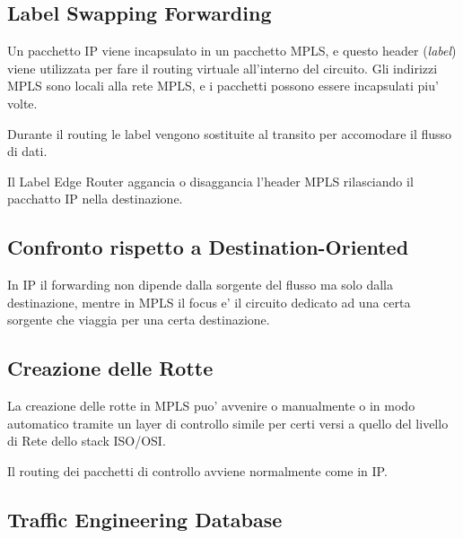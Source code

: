 
\subsection{Label Swapping Forwarding}

Un pacchetto IP viene incapsulato in un pacchetto MPLS, e questo header (\textit{label}) viene utilizzata per fare il routing virtuale all'interno del circuito.
Gli indirizzi MPLS sono locali alla rete MPLS, e i pacchetti possono essere incapsulati piu' volte.


Durante il routing le label vengono sostituite al transito per accomodare il flusso di dati.


Il Label Edge Router aggancia o disaggancia l'header MPLS rilasciando il pacchatto IP nella destinazione.


\subsection{Confronto rispetto a Destination-Oriented}

In IP il forwarding non dipende dalla sorgente del flusso ma solo dalla destinazione, mentre in MPLS il focus e' il circuito dedicato ad una certa sorgente che viaggia per una certa destinazione.



\subsection{Creazione delle Rotte}

La creazione delle rotte in MPLS puo' avvenire o manualmente o in modo automatico tramite un layer di controllo simile per certi versi a quello del livello di Rete dello stack ISO/OSI.


Il routing dei pacchetti di controllo avviene normalmente come in IP.

\subsection{Traffic Engineering Database}

